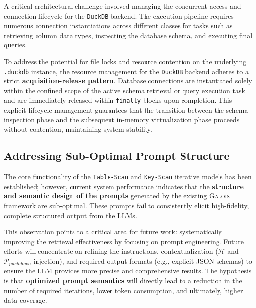 A critical architectural challenge involved managing the concurrent access and connection lifecycle for the \texttt{DuckDB} backend. The execution pipeline requires numerous connection instantiations across different classes for tasks such as retrieving column data types, inspecting the database schema, and executing final queries.

To address the potential for file locks and resource contention on the underlying \texttt{.duckdb} instance, the resource management for the \texttt{DuckDB} backend adheres to a strict \textbf{acquisition-release pattern}. Database connections are instantiated solely within the confined scope of the active schema retrieval or query execution task and are immediately released within \texttt{finally} blocks upon completion. This explicit lifecycle management guarantees that the transition between the schema inspection phase and the subsequent in-memory virtualization phase proceeds without contention, maintaining system stability.

\subsection{Addressing Sub-Optimal Prompt Structure}

The core functionality of the \texttt{Table-Scan} and \texttt{Key-Scan} iterative models has been established; however, current system performance indicates that the \textbf{structure and semantic design of the prompts} generated by the existing \textsc{Galois} framework are sub-optimal. These prompts fail to consistently elicit high-fidelity, complete structured output from the LLMs.

This observation points to a critical area for future work: systematically improving the retrieval effectiveness by focusing on prompt engineering. Future efforts will concentrate on refining the instructions, contextualization ($\mathcal{H}$ and $\mathcal{P}_{pushdown}$ injection), and required output formats (e.g., explicit JSON schemas) to ensure the LLM provides more precise and comprehensive results. The hypothesis is that \textbf{optimized prompt semantics} will directly lead to a reduction in the number of required iterations, lower token consumption, and ultimately, higher data coverage.